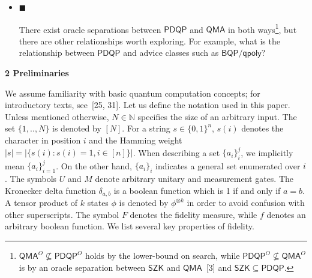 \begin{itemize}
\item[] 
$\blacksquare$ 


There exist oracle separations between $\mathsf{PDQP}$ and $\mathsf{QMA}$ in both ways\footnote{$\mathsf{QMA}^{O}\not\subseteq\mathsf{PDQP}^{O}$ holds by the lower-bound on search, while $\mathsf{PDQP}^{O}\not\subseteq\mathsf{QMA}^{O}$ is by an oracle separation between $\mathsf{SZK}$ and $\mathsf{QMA}$ [3] and $\mathsf{SZK}\subseteq\mathsf{PDQP}$.}, but there are other relationships worth exploring. For example, what is the relationship between $\mathsf{PDQP}$ and advice classes such as $\mathsf{BQP/qpoly}$?\par





\end{itemize}






\par\medskip\noindent\textbf{
2 Preliminaries}\par




We assume familiarity with basic quantum computation concepts; for introductory texts, see [25, 31].
Let us define the notation used in this paper. Unless mentioned otherwise, $N\in\mathbb{N}$ specifies the size of an arbitrary input. The set $\{1,..,N\}$ is denoted by $[N]$. For a string $s\in\{0,1\}^{n}$, $s(i)$ denotes the character in position $i$ and the Hamming weight $|s|=|\{s(i):s(i)=1,i\in[n]\}|$. When describing a set $\{a_{i}\}_{i}^{j}$, we implicitly mean $\{a_{i}\}_{i=1}^{j}$. On the other hand, $\{a_{i}\}_{i}$ indicates a general set enumerated over $i$. The symbols $U$ and $M$ denote arbitrary unitary and measurement gates. The Kronecker delta function $\delta_{a,b}$ is a boolean function which is 1 if and only if $a=b$.
A tensor product of $k$ states $\phi$ is denoted by $\phi^{\otimes k}$ in order to avoid confusion with other superscripts.
The symbol $F$ denotes the fidelity measure, while $f$ denotes an arbitrary boolean function. We list several key properties of fidelity.\par




